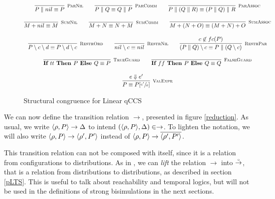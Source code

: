 \begin{figure}[h!]
\caption{Structural congruence for Linear qCCS}
\label{str_cong}
\begin{gather*}
    \infer[\mbox{\footnotesize\scshape ParNil}]{P \parallel nil \equiv P}{} \qquad
    \infer[\mbox{\footnotesize\scshape ParComm}]{P \parallel Q \equiv Q \parallel P}{} \qquad
    \infer[\mbox{\footnotesize\scshape ParAssoc}]{P \parallel (Q \parallel R) \equiv (P \parallel Q) \parallel R}{} 
    \\[0.3cm]
    \infer[\mbox{\footnotesize\scshape SumNil}]{M + nil \equiv M}{} \qquad
    \infer[\mbox{\footnotesize\scshape SumComm}]{M + N \equiv N + M}{} \qquad
    \infer[\mbox{\footnotesize\scshape SumAssoc}]{M + (N + O) \equiv (M + N) + O}{} 
    \\[0.3cm]
    \infer[\mbox{\footnotesize\scshape RestrOrd}]{P \setminus c \setminus d \equiv P \setminus d \setminus c}{} \qquad 
    \infer[\mbox{\footnotesize\scshape RestrNil}]{nil \setminus c \equiv nil}{} \qquad 
    \infer[\mbox{\footnotesize\scshape RestrPar}]{(P \parallel Q) \setminus c \equiv P \parallel (Q \setminus c)}{c \not\in fc(P)} \\[0.3cm]
    \infer[\mbox{\footnotesize\scshape TrueGuard}]{\ITE{tt}{P}{Q} \equiv P}{} \qquad
    \infer[\mbox{\footnotesize\scshape FalseGuard}]{\ITE{ff}{P}{Q} \equiv Q}{} \\[0.3cm]
    \infer[\mbox{\footnotesize\scshape ValExpr}]{ P \equiv P[\sfrac{e'}{e}] }{e \Downarrow e'} 
	\end{gather*}	
\end{figure}

We can now define the transition relation $\rightarrow$, presented in figure \ref{reduction}. As usual, we write $\langle\rho, P\rangle \rightarrow \Delta$ to intend $(\langle\rho, P\rangle, \Delta) \in \rightarrow$. To lighten the notation, we will also write $\langle\rho, P\rangle \rightarrow \langle\rho', P'\rangle$ instead of $\langle\rho, P\rangle \rightarrow \overline{\langle\rho', P'\rangle}$.

This transition relation can not be composed with itself, since it is a relation from configurations to distributions. As in \cite{fengBisimulationQuantumProcesses2012}, we can \textit{lift} the relation $\rightarrow$ into $\stackrel{\scriptscriptstyle \circ}{\rightarrow}$, that is a relation from distributions to distributions, as described in section \ref{pLTS}. This is useful to talk about reachability and temporal logics, but will not be used in the definitions of strong bisimulations in the next sections.

